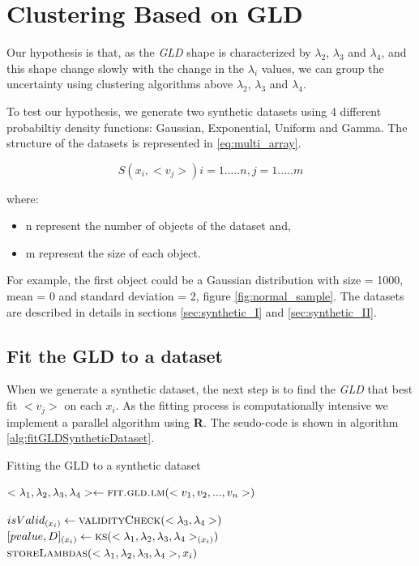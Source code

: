 \section{Clustering Based on GLD}\label{sec:clustering_gld}

Our hypothesis is that, as the \textit{GLD} shape is characterized by $\lambda_{2}$, $\lambda_{3}$ and $\lambda_{4}$, and this shape change slowly with the change in the $\lambda_{i}$  values, we can group the uncertainty using clustering algorithms above $\lambda_{2}$, $\lambda_{3}$ and $\lambda_{4}$.  

To test our hypothesis, we generate two synthetic datasets using 4 different probabiltiy density functions: Gaussian, Exponential, Uniform and Gamma. The structure of the datasets is represented in \ref{eq:multi_array}.  

\begin{equation}\label{eq:multi_array}
S(x_{i}, <v_{j}>) i=1.....n,j=1.....m
\end{equation}

where:
\begin{itemize}
\item n represent the number of objects of the dataset and,
\item m represent the size of each object.
\end{itemize}

For example, the first object could be a Gaussian distribution with size = 1000, mean = 0 and standard deviation = 2, figure \ref{fig:normal_sample}. The datasets are described in details in sections \ref{sec:synthetic_I} and \ref{sec:synthetic_II}. 


\subsection{Fit the GLD to a dataset}\label{sub:fitting_gld}
When we generate a synthetic dataset, the next step is to find the \textit{GLD} that best fit $<v_{j}>$ on each $x_{i}$. As the fitting process is computationally intensive we implement a parallel algorithm using \textbf{R}. The seudo-code is shown in algorithm \ref{alg:fitGLDSyntheticDataset}.

\begin{algorithm} 
\caption{Fitting the GLD to a synthetic dataset}\label{alg:fitGLDSyntheticDataset}
\begin{algorithmic}[1] 
\State $<\lambda_{1},\lambda_{2},\lambda_{3},\lambda_{4}> \gets \Call {fit.gld.lm}{<v_1,v_2,...,v_{n}>}$

\State $isValid_{(x_{i})} \gets \Call {validityCheck}{<\lambda_{3},\lambda_{4}>}$
\State $[pvalue,D]_{(x_{i})} \gets \Call{ks}{<\lambda_{1},\lambda_{2},\lambda_{3},\lambda_{4}>_{(x_{i})}}$
\EndIf
{}
\State $\Call{storeLambdas}{<\lambda_{1},\lambda_{2},\lambda_{3},\lambda_{4}>,x_{i}}$
\EndIf
\EndFunction 
\end{algorithmic} 
\end{algorithm} 


